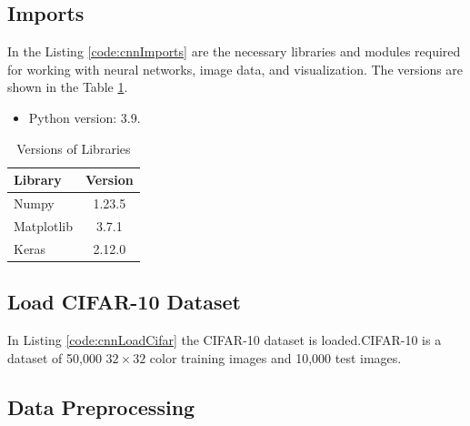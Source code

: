 {	\subsection{Imports}
	
	In the Listing \ref{code:cnnImports} are the necessary libraries and modules required for working with neural networks, image data, and visualization. The versions are shown in the Table \ref{tab:cnnlibraryVersions}.
	
	\begin{itemize}
		\item Python version: 3.9.
	\end{itemize}
	
	\begin{table}[htbp]
		\centering
		\caption{Versions of Libraries}
		\label{tab:cnnlibraryVersions}
		\begin{tabular}{|l|c|}
			\hline
			\textbf{Library} & \textbf{Version} \\
			\hline
			Numpy & 1.23.5 \\
			Matplotlib & 3.7.1 \\
			Keras & 2.12.0 \\
			\hline
		\end{tabular}
	\end{table}
	
	\begin{code}[h!]
		    
		
		\caption{Importing necessary libraries and modules.}
		\label{code:cnnImports}
	\end{code}
	
	\subsection{Load CIFAR-10 Dataset}
	
	In Listing \ref{code:cnnLoadCifar} the CIFAR-10 dataset is loaded.CIFAR-10 is a dataset of 50,000 $32 \times 32$ color training images and 10,000 test images.
	
	\begin{code}[h!]
		    
		
		\caption{Loading and preparing the CIFAR-10 dataset.}
		\label{code:cnnLoadCifar}
	\end{code}
	
	\subsection{Data Preprocessing}
	
}
